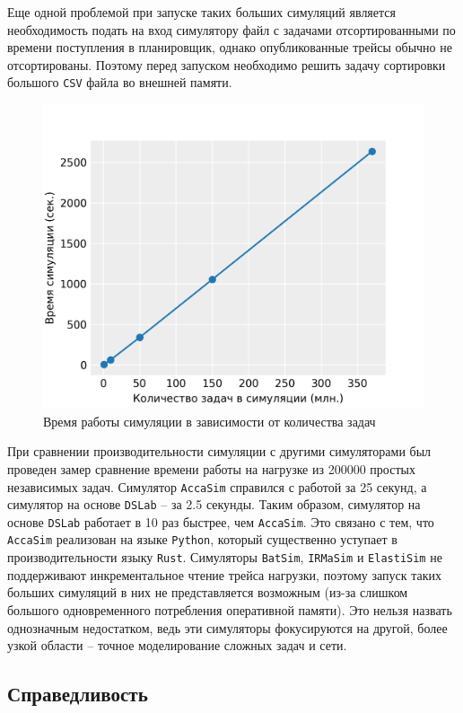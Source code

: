 Еще одной проблемой при запуске таких больших симуляций является необходимость подать на вход симулятору файл с задачами отсортированными по времени поступления в планировщик, однако опубликованные трейсы обычно не отсортированы. Поэтому перед запуском необходимо решить задачу сортировки большого \texttt{CSV} файла во внешней памяти. 

\begin{figure}[h!]
  \centering 
  \includegraphics[width=0.8\linewidth]{images/simulation_time}
  \caption{Время работы симуляции в зависимости от количества задач}
  \label{fig:speed-test}
\end{figure}

При сравнении производительности симуляции с другими симуляторами был проведен замер сравнение времени работы на нагрузке из 200000 простых независимых задач. Симулятор \texttt{AccaSim} справился с работой за 25 секунд, а симулятор на основе \texttt{DSLab} -- за 2.5 секунды. Таким образом, симулятор на основе \texttt{DSLab} работает в 10 раз быстрее, чем \texttt{AccaSim}. Это связано с тем, что \texttt{AccaSim} реализован на языке \texttt{Python}, который существенно уступает в производительности языку \texttt{Rust}. Симуляторы \texttt{BatSim}, \texttt{IRMaSim} и \texttt{ElastiSim} не поддерживают инкрементальное чтение трейса нагрузки, поэтому запуск таких больших симуляций в них не представляется возможным (из-за слишком большого одновременного потребления оперативной памяти). Это нельзя назвать однозначным недостатком, ведь эти симуляторы фокусируются на другой, более узкой области -- точное моделирование сложных задач и сети.  

\subsection{Справедливость}\label{sec:example-fairness}

